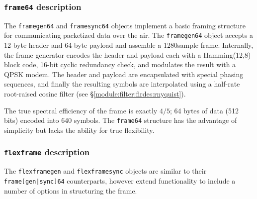 \subsubsection{{\tt frame64} description}
\label{module:framing:frames:frame64}
The {\tt framegen64} and {\tt framesync64} objects implement a basic framing
structure for communicating packetized data over the air.
The {\tt framegen64} object accepts a 12-byte header and 64-byte payload and
assemble a 1280sample frame.
Internally, the frame generator encodes the header and payload each with a
Hamming(12,8) block code, 16-bit cyclic redundancy check, and modulates the
result with a QPSK modem.
The header and payload are encapsulated with special phasing sequences, and
finally the resulting symbols are interpolated using a half-rate root-raised
cosine filter (see \S\ref{module:filter:firdes:rnyquist}).

The true spectral efficiency of the frame is exactly $4/5$; 64 bytes of data
(512 bits) encoded into 640 symbols.
The {\tt frame64} structure has the advantage of simplicity but lacks the
ability for true flexibility.

\subsubsection{{\tt flexframe} description}
\label{module:framing:frames:flexframe}
The {\tt flexframegen} and {\tt flexframesync} objects are similar to their
{\tt frame[gen|sync]64} counterparts, however extend functionality to include
a number of options in structuring the frame.

